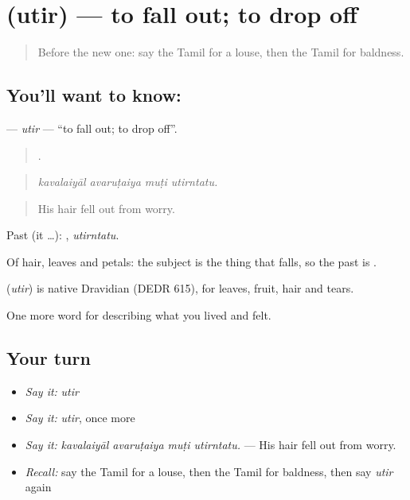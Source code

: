 \section[\texorpdfstring{\ta{உதிர்} (utir)}{உதிர் (utir)}]{ (utir) — to fall out; to drop off}

\label{lesson:TA-C484-utir}



\begin{quote}
Before the new one: say the Tamil for a louse, then the Tamil for baldness.
\end{quote}

\subsection*{You'll want to know: }
\textbf{} — \emph{utir} — \textquotedblleft{}to fall out; to drop off\textquotedblright{}.

\begin{quote}
   .
\end{quote}

\begin{quote}
\emph{kavalaiyāl avaruṭaiya muṭi utirntatu.}
\end{quote}

\begin{quote}
His hair fell out from worry.
\end{quote}

Past (it …): , \emph{utirntatu}.

Of hair, leaves and petals: the subject is the thing that falls, so the past is .

\begin{cousinweb}
\textbf{} (\emph{utir}) is native Dravidian (DEDR 615), for leaves, fruit, hair and tears.
\end{cousinweb}

\begin{grammarlens}[title={What you've built}]
One more word for describing what you lived and felt.
\end{grammarlens}

\subsection*{Your turn}
\begin{itemize}
\raggedright
  \item \emph{Say it:} \emph{utir}
  \item \emph{Say it:} \emph{utir}, once more
  \item \emph{Say it:} \emph{kavalaiyāl avaruṭaiya muṭi utirntatu.} — His hair fell out from worry.
  \item \emph{Recall:} say the Tamil for a louse, then the Tamil for baldness, then say \emph{utir} again
\end{itemize}

